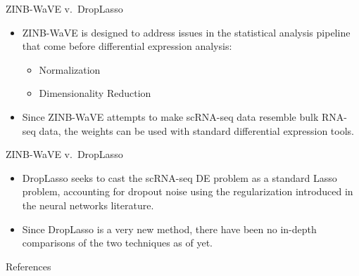 \documentclass{beamer}
\begin{document}
\begin{frame}{ZINB-WaVE v.~DropLasso}

\begin{itemize}
  \itemsep12pt
  \item ZINB-WaVE is designed to address issues in the statistical analysis
    pipeline that come before differential expression analysis:
    \begin{itemize}
      \item Normalization
      \item Dimensionality Reduction
    \end{itemize}
  \item Since ZINB-WaVE attempts to make scRNA-seq data resemble bulk RNA-seq
    data, the weights can be used with standard differential expression tools.
\end{itemize}

\end{frame}


\begin{frame}{ZINB-WaVE v.~DropLasso}

\begin{itemize}
  \itemsep12pt
  \item DropLasso seeks to cast the scRNA-seq DE problem as a standard Lasso
    problem, accounting for dropout noise using the regularization introduced in
    the neural networks literature.
  \item Since DropLasso is a very new method, there have been no in-depth
    comparisons of the two techniques as of yet.
\end{itemize}

\end{frame}


\setbeamercovered{}
\beamerdefaultoverlayspecification{}

\begin{frame}[c,allowframebreaks]{References}

\small

\nocite{*}

\itemize

\end{frame}

\end{document}
